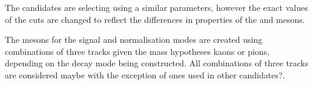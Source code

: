 The \Dzb candidates are selecting using a similar parameters, however the exact values of the cuts are changed to reflect the differences in properties of the \phiz and \Dzb mesons.





The \Dsp mesons for the signal and normalisation modes are created using combinations of three tracks given the mass hypotheses kaons or pions, depending on the decay mode being constructed. All combinations of three tracks are considered {\color{Red} maybe with the exception of ones used in other candidates?}. 




